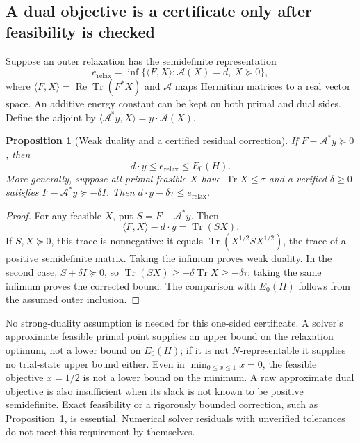 \documentclass[11pt,a4paper]{article}
\theoremstyle{plain}
\newtheorem{proposition}[theorem]{Proposition}
\theoremstyle{definition}
\theoremstyle{remark}
\DeclareMathOperator{\Tr}{Tr}
\begin{document}
\subsection{A dual objective is a certificate only after feasibility is checked}
Suppose an outer relaxation has the semidefinite representation
\begin{equation}
 e_{\mathrm{relax}}=
 \inf\{\langle F,X\rangle:\mathcal A(X)=d,\ X\succeq0\},
 \label{eq:sdp-primal}
\end{equation}
where $\langle F,X\rangle=\operatorname{Re}\Tr(F^*X)$ and
$\mathcal A$ maps Hermitian matrices to a real vector space. An additive
energy constant can be kept on both primal and dual sides. Define the
adjoint by $\langle\mathcal A^*y,X\rangle=y\cdot\mathcal A(X)$.

\begin{proposition}[Weak duality and a certified residual correction]
\label{prop:dual}
If $F-\mathcal A^*y\succeq0$, then
\[
 d\cdot y\le e_{\mathrm{relax}}\le E_0(H).
\]
More generally, suppose all primal-feasible $X$ have
$\Tr X\le\tau$ and a verified $\delta\ge0$ satisfies
$F-\mathcal A^*y\succeq-\delta I$. Then
$d\cdot y-\delta\tau\le e_{\mathrm{relax}}$.
\end{proposition}
\begin{proof}
For any feasible $X$, put $S=F-\mathcal A^*y$. Then
\[
 \langle F,X\rangle-d\cdot y=\Tr(SX).
\]
If $S,X\succeq0$, this trace is nonnegative: it equals
$\Tr(X^{1/2}SX^{1/2})$, the trace of a positive semidefinite matrix.
Taking the infimum proves weak duality. In the second case,
$S+\delta I\succeq0$, so
$\Tr(SX)\ge-\delta\Tr X\ge-\delta\tau$; taking the same infimum
proves the corrected bound. The comparison with $E_0(H)$ follows from
the assumed outer inclusion.
\end{proof}

No strong-duality assumption is needed for this one-sided certificate.
A solver's approximate feasible primal point supplies an upper bound on the
relaxation optimum, not a lower bound on $E_0(H)$; if it is not
$N$-representable it supplies no trial-state upper bound either. Even in
$\min_{0\le x\le1}x=0$, the feasible objective $x=1/2$ is not a lower
bound on the minimum. A raw approximate dual objective is also insufficient
when its slack is not known to be positive semidefinite. Exact feasibility
or a rigorously bounded correction, such as Proposition~\ref{prop:dual},
is essential. Numerical solver residuals with unverified tolerances do not
meet this requirement by themselves.
\end{document}
